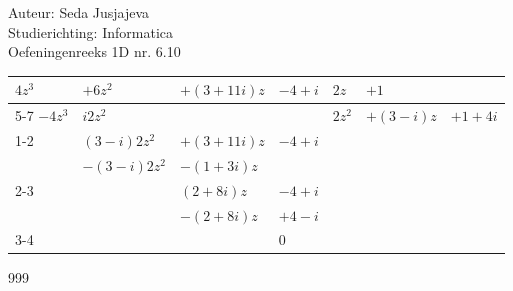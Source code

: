 \documentclass[a4paper]{article}
\begin{document}
\noindent \large Auteur: Seda Jusjajeva\\
\noindent \large Studierichting: Informatica\\
\noindent \large Oefeningenreeks 1D nr. 6.10\\

\medskip

\normalsize

\begin{tabular}{llll|lll}
$4z^3$  & $+6z^2$           & $+(3 + 11i)z$     & $-4 + i$  & $2z$      & $+1$          & \\
\cline{5-7}
$-4z^3$ & $i2z^2$           &                   &           & $2z^2$    & $+(3 - i)z$   & $+1 + 4i$ \\
\cline{1-2} 
        & $(3 - i)2z^2$     & $+(3 + 11i)z$     & $-4 + i$  &           &               & \\
        & $-(3 - i)2z^2$    & $-(1+3i)z$        &           &           &               & \\
\cline{2-3}
        &                   & $(2 + 8i)z$       & $-4 + i$  &           &               & \\
        &                   & $-(2 + 8i)z$      & $+4 - i$  &           &               & \\
\cline{3-4}
        &                   &                   & $0$       &           &               &
\end{tabular}



\begin{thebibliography}{999}
\end{thebibliography}
\end{document}
